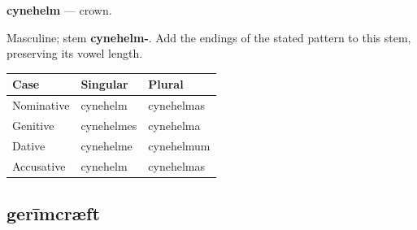 \par\begin{minipage}{\linewidth}\raggedright
\textbf{cynehelm} — crown.

Masculine; stem \textbf{cynehelm-}. Add the endings of the stated pattern to this stem, preserving its vowel length.

\par\begingroup
\fontsize{10.5}{13.2}\selectfont
\setlength{\LTleft}{0pt}\setlength{\LTright}{\fill}
\noindent
\begin{tabular}{@{}>{\raggedright\arraybackslash}p{39.46mm}>{\raggedright\arraybackslash}p{39.46mm}>{\raggedright\arraybackslash}p{39.46mm}@{}}
\toprule
\textbf{Case} & \textbf{Singular} & \textbf{Plural} \\
\midrule
Nominative & cynehelm & cynehelmas \\
Genitive & cynehelmes & cynehelma \\
Dative & cynehelme & cynehelmum \\
Accusative & cynehelm & cynehelmas \\
\bottomrule
\end{tabular}
\par\endgroup

\end{minipage}\par
{}
\subsection*{gerīmcræft}

